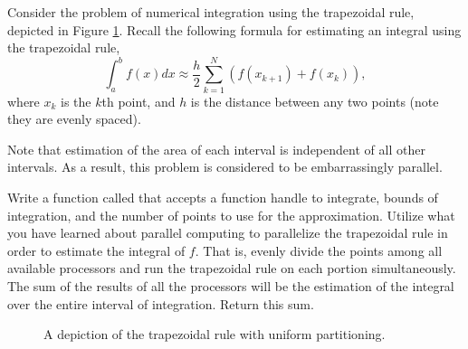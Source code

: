 \begin{problem}
Consider the problem of numerical integration using the trapezoidal rule, depicted in Figure \ref{fig:traprule}.
Recall the following formula for estimating an integral using the trapezoidal rule,
\[
\int_{a}^b f(x) dx \approx \frac{h}{2} \sum_{k=1}^N (f(x_{k+1}) + f(x_k)),
\]
where $x_k$ is the $k$th point, and $h$ is the distance between any two points (note they are evenly spaced).

Note that estimation of the area of each interval is independent of all other intervals. 
As a result, this problem is considered to be embarrassingly parallel.

Write a function called  that accepts a function handle to integrate, bounds of integration, and the number of points to use for the approximation. 
Utilize what you have learned about parallel computing to parallelize the trapezoidal rule in order to estimate the integral of $f$. 
That is, evenly divide the points among all available processors and run the trapezoidal rule on each portion simultaneously.
The sum of the results of all the processors will be the estimation of the integral over the entire interval of integration.
Return this sum. 

\begin{figure}[H]

\begin{center}
		
\end{center}
\label{fig:traprule}
\caption{A depiction of the trapezoidal rule with uniform partitioning.}
\end{figure}


\end{problem}


